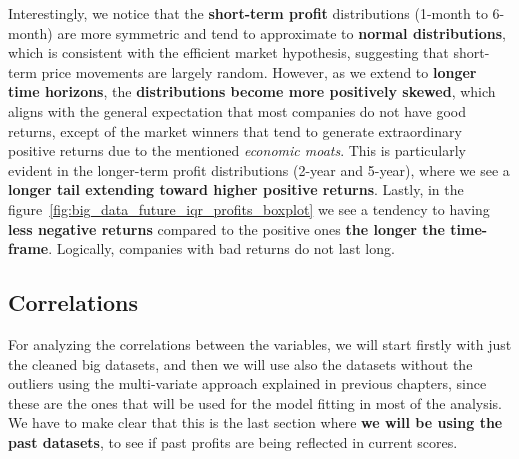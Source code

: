 \documentclass[11pt,english,a4paper,hidelinks]{book}
\begin{document}
\noindent Interestingly, we notice that the \textbf{short-term profit} distributions (1-month to 6-month) are more symmetric and tend to approximate to \textbf{normal distributions}, which is consistent with the efficient market hypothesis, suggesting that short-term price movements are largely random. However, as we extend to \textbf{longer time horizons}, the \textbf{distributions become more positively skewed}, which aligns with the general expectation that most companies do not have good returns, except of the market winners that tend to generate extraordinary positive returns due to the mentioned \textit{economic moats}. This is particularly evident in the longer-term profit distributions (2-year and 5-year), where we see a \textbf{longer tail extending toward higher positive returns}. Lastly, in the figure~\ref{fig:big_data_future_iqr_profits_boxplot} we see a tendency to having \textbf{less negative returns} compared to the positive ones \textbf{the longer the time-frame}. Logically, companies with bad returns do not last long.

\subsection{Correlations}

For analyzing the correlations between the variables, we will start firstly with just the cleaned big datasets, and then we will use also the datasets without the outliers using the multi-variate approach explained in previous chapters, since these are the ones that will be used for the model fitting in most of the analysis. We have to make clear that this is the last section where \textbf{we will be using the past datasets}, to see if past profits are being reflected in current scores.
\end{document}
